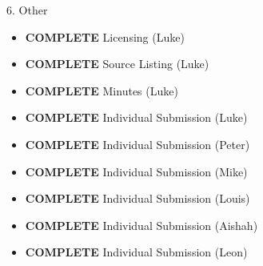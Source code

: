 6. Other
\begin{itemize}
\item \textbf{COMPLETE}   Licensing (Luke)
\item \textbf{COMPLETE}   Source Listing (Luke)
\item \textbf{COMPLETE}   Minutes (Luke)
\item \textbf{COMPLETE}   Individual Submission (Luke)
\item \textbf{COMPLETE}   Individual Submission (Peter)
\item \textbf{COMPLETE}   Individual Submission (Mike)
\item \textbf{COMPLETE}   Individual Submission (Louis)
\item \textbf{COMPLETE}   Individual Submission (Aishah)
\item \textbf{COMPLETE}   Individual Submission (Leon)
\end{itemize}
